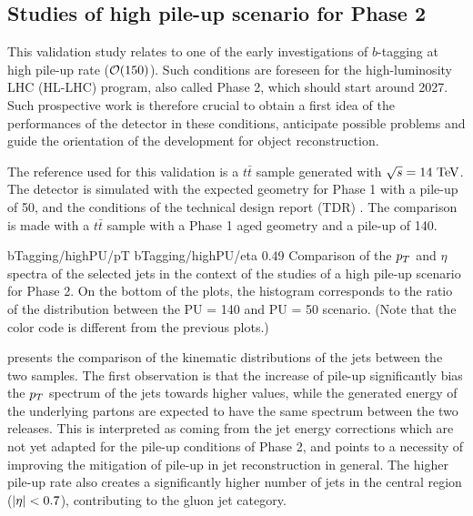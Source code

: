     \subsection{Studies of high pile-up scenario for Phase 2}

    This validation study relates to one of the early investigations of $b$-tagging at high
    pile-up rate ($\mathcal{O}(150)$). Such conditions are
    foreseen for the high-luminosity LHC (HL-LHC) program, also called Phase 2, which
    should start around 2027. Such prospective work is therefore crucial to obtain a first
    idea of the performances of the detector in these conditions, anticipate possible
    problems and guide the orientation of the development for object reconstruction.

    The reference used for this validation is a $t\bar{t}$ sample generated with $\sqrt{s}
    = 14~\text{TeV}$. The detector is simulated with the expected geometry for Phase 1 with
    a pile-up of 50, and the conditions of the technical design report (TDR) . The
    comparison is made with a $t\bar{t}$ sample with a Phase 1 aged geometry and a pile-up 
    of 140.

                     {bTagging/highPU/pT}
                     {bTagging/highPU/eta}
                     {0.49}
                     {Comparison of the $p_T$ and $\eta$ spectra of the selected jets
                     in the context of the studies of a high pile-up scenario for Phase 2.
                     On the bottom of the plots, the histogram corresponds
                     to the ratio of the distribution between the PU = 140 and PU = 50
                     scenario.
                     (Note that the color code is different from the previous plots.)}

     presents the comparison of the kinematic
    distributions of the jets between the two samples. The first observation is that the increase of pile-up
    significantly bias the $p_T$ spectrum of the jets towards higher values, while the
    generated energy of the underlying partons are expected to have the same spectrum
    between the two releases. This is interpreted as coming from the jet energy corrections
    which are not yet adapted for the pile-up conditions of Phase 2, and points to
    a necessity of improving the mitigation of pile-up in jet reconstruction in general.
    The higher pile-up rate also creates a significantly higher
    number of jets in the central region ($\left| \eta \right| < 0.7$), contributing to the gluon jet
    category.

